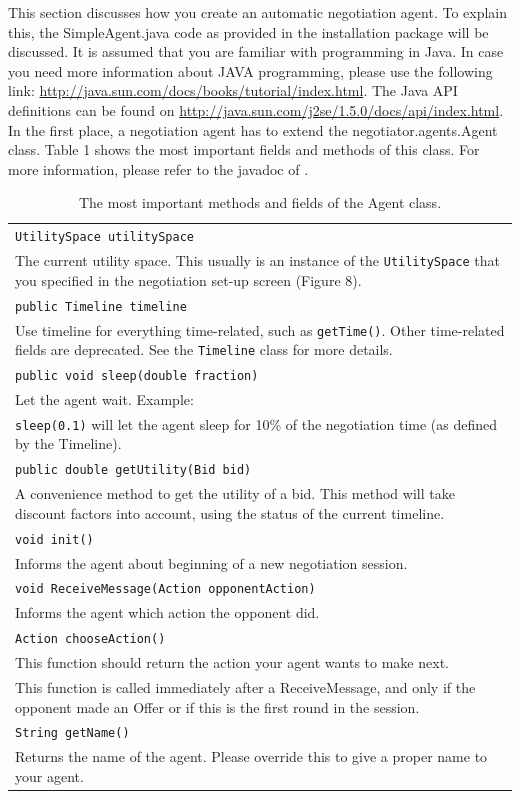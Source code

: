 \documentclass[]{article}
\begin{document}
{This section discusses how you create an automatic negotiation agent. To explain this, the SimpleAgent.java code as provided in the installation package will be discussed.
It is assumed that you are familiar with programming in Java. In case you need more information about JAVA programming, please use the following link: \url{http://java.sun.com/docs/books/tutorial/index.html}. The Java API definitions can be found on \url{http://java.sun.com/j2se/1.5.0/docs/api/index.html}.
In the first place, a negotiation agent has to extend the negotiator.agents.Agent class. Table 1 shows the most important fields and methods of this class. For more information, please refer to the javadoc of \Genius.

\begin{table}
\begin{tabular}{m{}}
\hline
\texttt{UtilitySpace utilitySpace}\\
The current utility space. This usually is an instance of the \texttt{UtilitySpace} that you specified in the negotiation set-up screen (Figure 8).\\
\hline
\texttt{public Timeline timeline}\\
Use timeline for everything time-related, such as \texttt{getTime()}. Other time-related fields are deprecated. See the \texttt{Timeline} class for more details.\\
\hline
\texttt{public void sleep(double fraction)}\\
Let the agent wait. Example:\\
\texttt{sleep(0.1)} will let the agent sleep for 10\% of the negotiation time (as defined by the Timeline).\\
\hline
\texttt{public double getUtility(Bid bid)}\\
A convenience method to get the utility of a bid. This method will take discount factors into account, using the status of the current timeline.\\
\hline
\texttt{void init()}\\
Informs the agent about beginning of a new negotiation session.\\
\hline
\texttt{void ReceiveMessage(Action opponentAction)}\\
Informs the agent which action the opponent did.\\
\hline
\texttt{Action chooseAction()}\\
This function should return the action your agent wants to make next.\\
This function is called immediately after a ReceiveMessage, and only if the opponent made an Offer or if this is the first round in the session.\\
\hline
\texttt{String getName()}\\
Returns the name of the agent. Please override this to give a proper name to your agent.\\
\end{tabular}
\caption{The most important methods and fields of the Agent class.}
\end{table}

}
\end{document}
